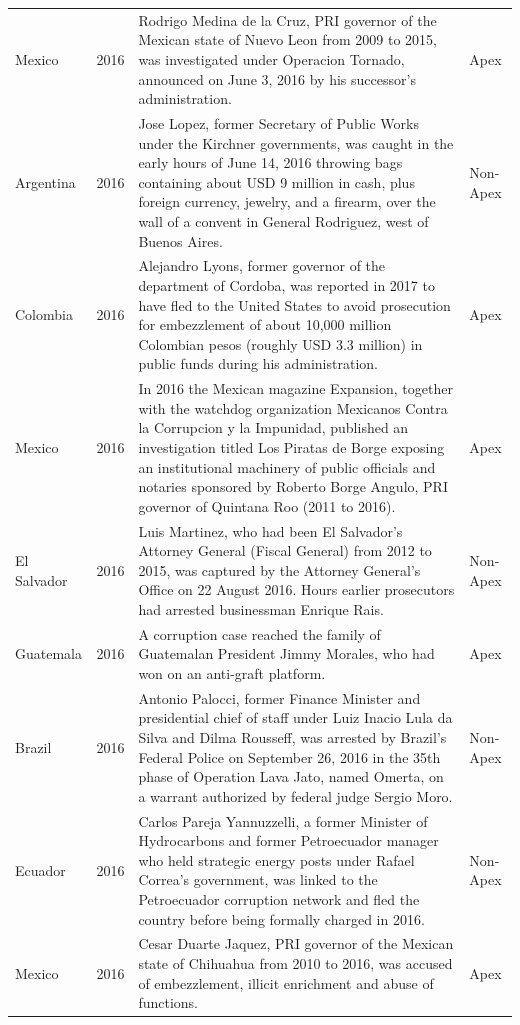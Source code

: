 \begin{landscape}
\begin{longtable}{@{}l c p{15.5cm} l@{}}
Mexico & 2016 & Rodrigo Medina de la Cruz, PRI governor of the Mexican state of Nuevo Leon from 2009 to 2015, was investigated under Operacion Tornado, announced on June 3, 2016 by his successor's administration. & Apex \\
Argentina & 2016 & Jose Lopez, former Secretary of Public Works under the Kirchner governments, was caught in the early hours of June 14, 2016 throwing bags containing about USD 9 million in cash, plus foreign currency, jewelry, and a firearm, over the wall of a convent in General Rodriguez, west of Buenos Aires. & Non-Apex \\
Colombia & 2016 & Alejandro Lyons, former governor of the department of Cordoba, was reported in 2017 to have fled to the United States to avoid prosecution for embezzlement of about 10,000 million Colombian pesos (roughly USD 3.3 million) in public funds during his administration. & Apex \\
Mexico & 2016 & In 2016 the Mexican magazine Expansion, together with the watchdog organization Mexicanos Contra la Corrupcion y la Impunidad, published an investigation titled Los Piratas de Borge exposing an institutional machinery of public officials and notaries sponsored by Roberto Borge Angulo, PRI governor of Quintana Roo (2011 to 2016). & Apex \\
El Salvador & 2016 & Luis Martinez, who had been El Salvador's Attorney General (Fiscal General) from 2012 to 2015, was captured by the Attorney General's Office on 22 August 2016. Hours earlier prosecutors had arrested businessman Enrique Rais. & Non-Apex \\
Guatemala & 2016 & A corruption case reached the family of Guatemalan President Jimmy Morales, who had won on an anti-graft platform. & Apex \\
Brazil & 2016 & Antonio Palocci, former Finance Minister and presidential chief of staff under Luiz Inacio Lula da Silva and Dilma Rousseff, was arrested by Brazil's Federal Police on September 26, 2016 in the 35th phase of Operation Lava Jato, named Omerta, on a warrant authorized by federal judge Sergio Moro. & Non-Apex \\
Ecuador & 2016 & Carlos Pareja Yannuzzelli, a former Minister of Hydrocarbons and former Petroecuador manager who held strategic energy posts under Rafael Correa's government, was linked to the Petroecuador corruption network and fled the country before being formally charged in 2016. & Non-Apex \\
Mexico & 2016 & Cesar Duarte Jaquez, PRI governor of the Mexican state of Chihuahua from 2010 to 2016, was accused of embezzlement, illicit enrichment and abuse of functions. & Apex \\

\end{longtable}
\end{landscape}
